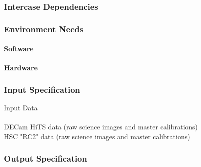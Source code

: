 \subsubsection{Intercase Dependencies}

\subsubsection{Environment Needs}

\paragraph{Software}

\paragraph{Hardware}

\subsubsection{Input Specification}
Input Data\\
~\\
DECam HiTS data (raw science images and master calibrations)\\
HSC "RC2" data (raw science images and master calibrations)


\subsubsection{Output Specification}

